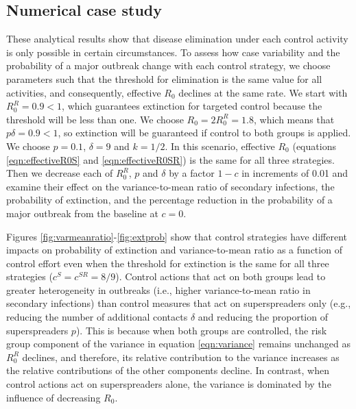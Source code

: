 \documentclass{imammb}
\numberwithin{equation}{section}
\begin{document}
\subsection{Numerical case study}

These analytical results show that disease elimination under each control activity is only possible in certain circumstances.  To assess how case variability and the probability of a major outbreak change with each control strategy, we choose parameters such that the threshold for elimination is the same value for all activities, and consequently, effective $R_0$ declines at the same rate. We start with $R_0^R = 0.9 <1$, which guarantees extinction for targeted control because the threshold will be less than one. We choose $R_0 = 2 R_0^R = 1.8$, which means that $p \delta = 0.9 <1$, so extinction will be guaranteed if control to both groups is applied. We choose $p = 0.1$, $\delta = 9$ and $k=1/2$. In this scenario, effective $R_0$ (equations \eqref{eqn:effectiveR0S} and \eqref{eqn:effectiveR0SR}) is the same for all three strategies. Then we decrease each of $R_0^R$, $p$ and $\delta$ by a factor $1-c$ in increments of 0.01 and examine their effect on the variance-to-mean ratio of secondary infections, the probability of extinction, and the percentage reduction in the probability of a major outbreak from the baseline at $c=0$.


Figures \ref{fig:varmeanratio}-\ref{fig:extprob} show that control strategies have different impacts on probability of extinction and  variance-to-mean ratio as a function of control effort even when the threshold for extinction is the same for all three strategies ($c^S = c^{SR} = 8/9$). Control actions that act on both groups lead to greater heterogeneity in outbreaks (i.e., higher variance-to-mean ratio in secondary infections) than control measures that act on superspreaders only (e.g., reducing the number of additional contacts $\delta$ and reducing the proportion of superspreaders $p$). This is because when both groups are controlled, the risk group component of the variance in equation \eqref{eqn:variance} remains unchanged as $R_0^R$ declines, and therefore, its relative contribution to the variance increases as the relative contributions of the other components decline. In contrast, when control actions act on superspreaders alone, the variance is dominated by the influence of decreasing $R_0$. 
\end{document}
